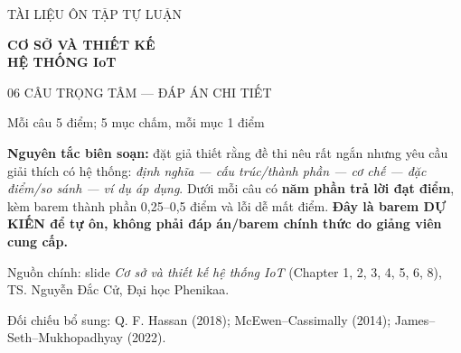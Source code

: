 \documentclass[11pt,a4paper]{article}
\begin{document}
\begin{titlepage}
\centering\vspace*{24mm}
{\color{teal}\sffamily\Large TÀI LIỆU ÔN TẬP TỰ LUẬN\par}\vspace{8mm}
{\color{navy}\sffamily\bfseries\fontsize{26}{33}\selectfont CƠ SỞ VÀ THIẾT KẾ\\HỆ THỐNG IoT\par}\vspace{9mm}
{\sffamily\LARGE 06 CÂU TRỌNG TÂM --- ĐÁP ÁN CHI TIẾT\par}\vspace{7mm}
{\large Mỗi câu 5 điểm; 5 mục chấm, mỗi mục 1 điểm\par}\vspace{16mm}
\begin{notesbox}
\textbf{Nguyên tắc biên soạn:} đặt giả thiết rằng đề thi nêu rất ngắn nhưng yêu cầu giải thích có hệ thống: \emph{định nghĩa --- cấu trúc/thành phần --- cơ chế --- đặc điểm/so sánh --- ví dụ áp dụng}. Dưới mỗi câu có \textbf{năm phần trả lời đạt điểm}, kèm barem thành phần 0,25--0,5 điểm và lỗi dễ mất điểm. \textbf{Đây là barem DỰ KIẾN để tự ôn, không phải đáp án/barem chính thức do giảng viên cung cấp.}
\end{notesbox}
\vfill
{\small Nguồn chính: slide \textit{Cơ sở và thiết kế hệ thống IoT} (Chapter 1, 2, 3, 4, 5, 6, 8), TS. Nguyễn Đắc Cử, Đại học Phenikaa.\par}
{\small Đối chiếu bổ sung: Q. F. Hassan (2018); McEwen--Cassimally (2014); James--Seth--Mukhopadhyay (2022).\par}
{\large{}\par}
\end{titlepage}
\tableofcontents\newpage
\end{document}
